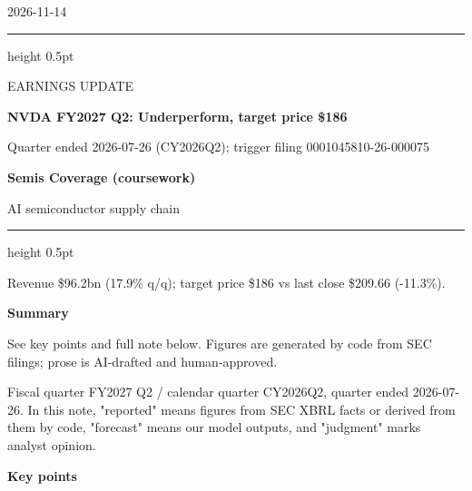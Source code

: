 \documentclass[a4paper,10pt]{article}
\newcommand{\ReportTitle}{NVDA FY2027 Q2: Underperform, target price \$186}
\newcommand{\ReportType}{EARNINGS UPDATE}
\newcommand{\ReportDate}{2026-11-14}
\newcommand{\ReportScope}{Quarter ended 2026-07-26 (CY2026Q2); trigger filing 0001045810-26-000075}
\newcommand{\TeamName}{Semis Coverage (coursework)}
\newcommand{\DeskName}{AI semiconductor supply chain}
\newcommand{\KeyFinding}{Revenue \$96.2bn (17.9\% q/q); target price \$186 vs last close \$209.66 (-11.3\%).}
\begin{document}
\begin{minipage}[t]{0.70\textwidth}
\vspace{0pt}
{\small\ReportDate}\par\medskip
{\color{MemoBlue}\hrule height 0.5pt}\smallskip
{\large\ReportType}\par
{\LARGE\bfseries\ReportTitle}\par\medskip
\ReportScope
\end{minipage}\hfill
\begin{minipage}[t]{0.23\textwidth}
\vspace{0pt}\raggedleft
\colorbox{MemoBlue}{\parbox[c][19mm][c]{0.86\linewidth}{\centering\color{white}\bfseries\TeamName}}\par\medskip
\DeskName
\end{minipage}
\par\bigskip
{\color{MemoBlue}\hrule height 0.5pt}\medskip
{\large\KeyFinding}\par\bigskip

\begin{minipage}[t]{0.61\textwidth}
\vspace{0pt}\raggedright
\setlength{\parskip}{4pt}
\textbf{Summary}\par
See key points and full note below. Figures are generated by code from SEC filings; prose is AI-drafted and human-approved.
\end{minipage}\hfill
\begin{minipage}[t]{0.36\textwidth}
\vspace{0pt}\small
\medskip
{}
\end{minipage}
\par\bigskip

Fiscal quarter FY2027 Q2 / calendar quarter CY2026Q2, quarter ended 2026-07-26. In this note, "reported" means figures from SEC XBRL facts or derived from them by code, "forecast" means our model outputs, and "judgment" marks analyst opinion.

\par\smallskip\textbf{\color{MemoBlue}Key points}\par
\end{document}
